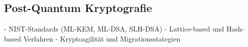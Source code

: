 \subsection{Post-Quantum Kryptografie} \label{sec:Post-Quantum Kryptografie}

- NIST-Standards (ML-KEM, ML-DSA, SLH-DSA)
- Lattice-based und Hash-based Verfahren
- Kryptoagilität und Migrationsstategien